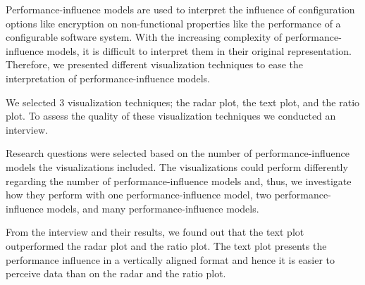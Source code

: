 \label{conclusion}

Performance-influence models are used to interpret the influence of configuration options like encryption on non-functional properties like the performance of a configurable software system. With the increasing complexity of performance-influence models, it is difficult to interpret them in their original representation. Therefore, we presented different visualization techniques to ease the interpretation of performance-influence models.

We selected 3 visualization techniques; the radar plot, the text plot, and the ratio plot. To assess the quality of these visualization techniques we conducted an interview. 

Research questions were selected based on the number of performance-influence models the visualizations included. The visualizations could perform differently regarding the number of performance-influence models and, thus, we investigate how they perform with one performance-influence model, two performance-influence models, and many performance-influence models.

From the interview and their results, we found out that the text plot outperformed the radar plot and the ratio plot. The text plot presents the performance influence in a vertically aligned format and hence it is easier to perceive data than on the radar and the ratio plot. 




